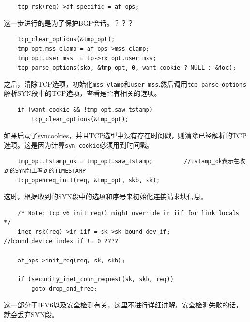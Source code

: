 \begin{verbatim}
    tcp_rsk(req)->af_specific = af_ops;
\end{verbatim}

        这一步进行的是为了保护BGP会话。？？？
        
\begin{verbatim}
    tcp_clear_options(&tmp_opt);
    tmp_opt.mss_clamp = af_ops->mss_clamp;
    tmp_opt.user_mss  = tp->rx_opt.user_mss;
    tcp_parse_options(skb, &tmp_opt, 0, want_cookie ? NULL : &foc);
\end{verbatim}

        之后，清除TCP选项，初始化\texttt{mss_vlamp}和\texttt{user_mss}.然后调用\texttt{tcp_parse_options}解析SYN段中的TCP选项，查看是否有相关的选项。

\begin{verbatim}
    if (want_cookie && !tmp_opt.saw_tstamp)
        tcp_clear_options(&tmp_opt);
\end{verbatim}

        如果启动了syncookies，并且TCP选型中没有存在时间戳，则清除已经解析的TCP选项。这是因为计算\texttt{syn_cookie}必须用到时间戳。

\begin{verbatim}
    tmp_opt.tstamp_ok = tmp_opt.saw_tstamp;         //tstamp_ok表示在收到的SYN包上看到的TIMESTAMP
    tcp_openreq_init(req, &tmp_opt, skb, sk);
\end{verbatim}

        这时，根据收到的SYN段中的选项和序号来初始化连接请求块信息。

\begin{verbatim}
    /* Note: tcp_v6_init_req() might override ir_iif for link locals */
    inet_rsk(req)->ir_iif = sk->sk_bound_dev_if;                        //bound device index if != 0 ????

    af_ops->init_req(req, sk, skb);

    if (security_inet_conn_request(sk, skb, req))
        goto drop_and_free;
\end{verbatim}

        这一部分于IPV6以及安全检测有关，这里不进行详细讲解。安全检测失败的话，就会丢弃SYN段。

